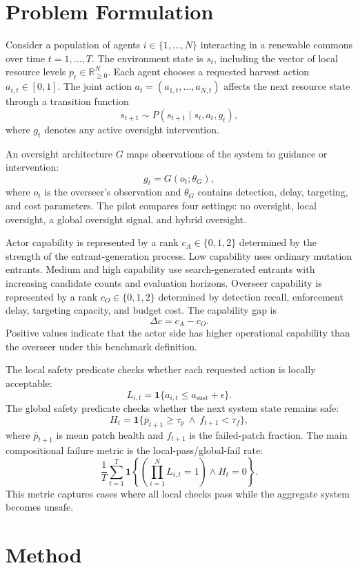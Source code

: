 \documentclass[11pt]{article}
\begin{document}
\section{Problem Formulation}

Consider a population of agents $i \in \{1,\ldots,N\}$ interacting in a renewable commons over time $t=1,\ldots,T$. The environment state is $s_t$, including the vector of local resource levels $p_t \in \mathbb{R}^N_{\geq 0}$. Each agent chooses a requested harvest action $a_{i,t} \in [0,1]$. The joint action $a_t = (a_{1,t},\ldots,a_{N,t})$ affects the next resource state through a transition function
\[
    s_{t+1} \sim P(s_{t+1} \mid s_t, a_t, g_t),
\]
where $g_t$ denotes any active oversight intervention.

An oversight architecture $G$ maps observations of the system to guidance or intervention:
\[
    g_t = G(o_t; \theta_G),
\]
where $o_t$ is the overseer's observation and $\theta_G$ contains detection, delay, targeting, and cost parameters. The pilot compares four settings: no oversight, local oversight, a global oversight signal, and hybrid oversight.

Actor capability is represented by a rank $c_A \in \{0,1,2\}$ determined by the strength of the entrant-generation process. Low capability uses ordinary mutation entrants. Medium and high capability use search-generated entrants with increasing candidate counts and evaluation horizons. Overseer capability is represented by a rank $c_O \in \{0,1,2\}$ determined by detection recall, enforcement delay, targeting capacity, and budget cost. The capability gap is
\[
    \Delta c = c_A - c_O.
\]
Positive values indicate that the actor side has higher operational capability than the overseer under this benchmark definition.

The local safety predicate checks whether each requested action is locally acceptable:
\[
    L_{i,t} = \mathbf{1}\{a_{i,t} \leq a_{\mathrm{sust}} + \epsilon\}.
\]
The global safety predicate checks whether the next system state remains safe:
\[
    H_t = \mathbf{1}\{\bar{p}_{t+1} \geq \tau_p \ \land\ f_{t+1} < \tau_f\},
\]
where $\bar{p}_{t+1}$ is mean patch health and $f_{t+1}$ is the failed-patch fraction. The main compositional failure metric is the local-pass/global-fail rate:
\[
    \frac{1}{T}\sum_{t=1}^T \mathbf{1}\left\{\left(\prod_{i=1}^N L_{i,t}=1\right) \land H_t=0\right\}.
\]
This metric captures cases where all local checks pass while the aggregate system becomes unsafe.

\section{Method}
\end{document}
